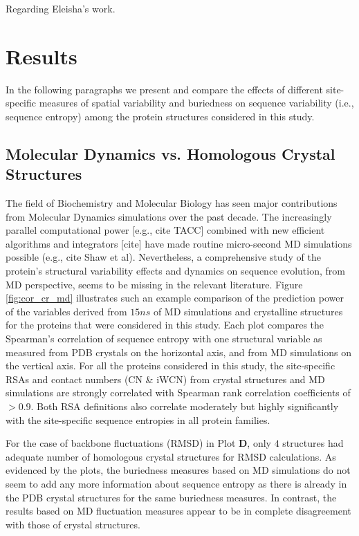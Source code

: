 \documentclass[preprint,12pt]{article}
\begin{document}
        Regarding Eleisha's work.
		
\section{Results}

    In the following paragraphs we present and compare the effects of different site-specific measures of spatial variability and buriedness on sequence variability (i.e., sequence entropy) among the protein structures considered in this study.

    \subsection{Molecular Dynamics vs. Homologous Crystal Structures}

        The field of Biochemistry and Molecular Biology has seen major contributions from Molecular Dynamics simulations over the past decade. The increasingly parallel computational power [e.g., cite TACC] combined with new efficient algorithms and integrators [cite] have made routine micro-second MD simulations possible (e.g., cite Shaw et al). Nevertheless, a comprehensive study of the protein's structural variability effects and dynamics on sequence evolution, from MD perspective, seems to be missing in the relevant literature. Figure \ref{fig:cor_cr_md} illustrates such an example comparison of the prediction power of the variables derived from $15ns$ of MD simulations and crystalline structures for the proteins that were considered in this study. Each plot compares the Spearman's correlation of sequence entropy with one structural variable as measured from PDB crystals on the horizontal axis, and from MD simulations on the vertical axis. For all the proteins considered in this study, the site-specific RSAs and contact numbers (CN \& iWCN) from crystal structures and MD simulations are strongly correlated with Spearman rank correlation coefficients of $>0.9$. Both RSA definitions also correlate moderately but highly significantly with the site-specific sequence entropies in all protein families. 
        
        For the case of backbone fluctuations (RMSD) in Plot {\bf D}, only $4$ structures had adequate number of homologous crystal structures for RMSD calculations. As evidenced by the plots, the buriedness measures based on MD simulations do not seem to add any more information about sequence entropy as there is already in the PDB crystal structures for the same buriedness measures. In contrast, the results based on MD fluctuation measures appear to be in complete disagreement with those of crystal structures.
\end{document}
